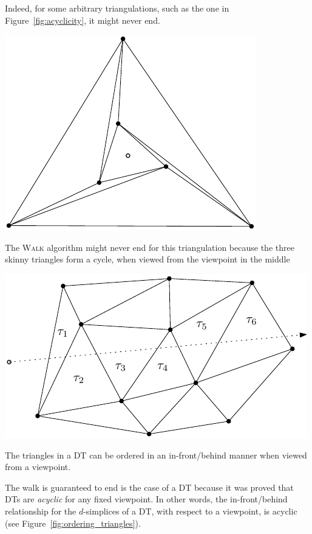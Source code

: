 Indeed, for some arbitrary triangulations, such as the one in Figure~\ref{fig:acyclicity}, it might never end. 
\begin{marginfigure}
  \centering
  \includegraphics[width=\linewidth]{acyclicity.pdf}
  \caption{The W\textsc{alk} algorithm might never end for this triangulation because the three skinny triangles form a cycle, when viewed from the viewpoint in the middle}%
\label{fig:acyclicity}
\end{marginfigure}

\begin{marginfigure}
  \centering
  \includegraphics[width=\linewidth]{ordering_triangles.pdf}
  \caption{The triangles in a DT can be ordered in an in-front/behind manner when viewed from a viewpoint.}%
\label{fig:ordering_triangles}
\end{marginfigure}

The walk is guaranteed to end is the case of a DT because it was proved that DTs are \emph{acyclic} for any fixed viewpoint. In other words, the in-front/behind relationship for the $d$-simplices of a DT, with respect to a viewpoint, is acyclic (see Figure~\ref{fig:ordering_triangles}).

